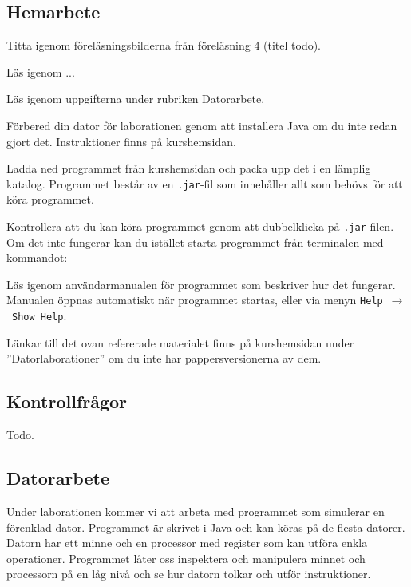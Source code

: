\subsection*{Hemarbete}
\begin{Hemarbete}\firmlist
    \item Titta igenom föreläsningsbilderna från föreläsning 4 (titel todo).
    \item Läs igenom ...
    \item Läs igenom uppgifterna under rubriken Datorarbete.
    \item Förbered din dator för laborationen genom att installera Java om du inte redan gjort det. Instruktioner finns på kurshemsidan.
    \item Ladda ned programmet \textbf{\progname{}} från kurshemsidan och packa upp det i en lämplig katalog. Programmet består av en \texttt{.jar}-fil som innehåller allt som behövs för att köra programmet.
    \item Kontrollera att du kan köra programmet genom att dubbelklicka på \texttt{.jar}-filen. Om det inte fungerar kan du istället starta programmet från terminalen med kommandot:
    \begin{center}
        {}
    \end{center}
    \item Läs igenom användarmanualen för programmet som beskriver hur det fungerar. Manualen öppnas automatiskt när programmet startas, eller via menyn \texttt{Help}~$\rightarrow$~\texttt{Show Help}.
\end{Hemarbete}
Länkar till det ovan refererade materialet finns på kurshemsidan under  ''Datorlaborationer'' om du inte har pappersversionerna av dem.

\subsection*{Kontrollfrågor}
\begin{Kontrollfragor}
    \item Todo.
\end{Kontrollfragor}

% 

\clearpage
\subsection*{Datorarbete}
Under laborationen kommer vi att arbeta med programmet \progname{} som simulerar en förenklad dator. Programmet är skrivet i Java och kan köras på de flesta datorer. Datorn har ett minne och en processor med register som kan utföra enkla operationer. Programmet låter oss inspektera och manipulera minnet och processorn på en låg nivå och se hur datorn tolkar och utför instruktioner.


